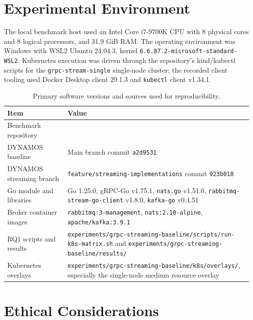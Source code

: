 \section{Experimental Environment}\label{sec:experimental-environment}

The local benchmark host used an Intel Core i7-9700K CPU with 8 physical cores and 8 logical processors, and 31.9 GiB RAM. The operating environment was Windows with WSL2 Ubuntu 24.04.3, kernel \texttt{6.6.87.2-microsoft-standard-WSL2}. Kubernetes execution was driven through the repository's kind/kubectl scripts for the \texttt{grpc-stream-single} single-node cluster; the recorded client tooling used Docker Desktop client 29.1.3 and \texttt{kubectl} client v1.34.1.

\begin{table}[!htbp]
    \centering
    \scriptsize
    \caption{Primary software versions and sources used for reproducibility.}
    \label{tab:environment-provenance}
    \setlength{\tabcolsep}{3pt}
    \begin{tabularx}{\textwidth}{p{}X}
        \toprule
        Item & Value \\
        \midrule
        Benchmark repository & \cite{streamingTechniquesExperiment2026} \\
        DYNAMOS baseline & Main branch commit \texttt{a2d9531} \cite{dynamosMainCommit2026} \\
        DYNAMOS streaming branch & \texttt{feature/streaming-implementations} commit \texttt{923b018} \cite{dynamosStreamingCommit2026} \\
        Go module and libraries & Go 1.25.0, gRPC-Go v1.75.1, \texttt{nats.go} v1.51.0, \texttt{rabbitmq-stream-go-client} v1.8.0, \texttt{kafka-go} v0.4.51 \\
        Broker container images & \texttt{rabbitmq:3-management}, \texttt{nats:2.10-alpine}, \texttt{apache/kafka:3.9.1} \\
        RQ1 scripts and results & \texttt{experiments/grpc-streaming-baseline/scripts/run-k8s-matrix.sh} and \texttt{experiments/grpc-streaming-baseline/results/} \\
        Kubernetes overlays & \texttt{experiments/grpc-streaming-baseline/k8s/overlays/}, especially the single-node medium resource overlay \\
        \bottomrule
    \end{tabularx}
\end{table}

\section{Ethical Considerations}\label{sec:ethics}

